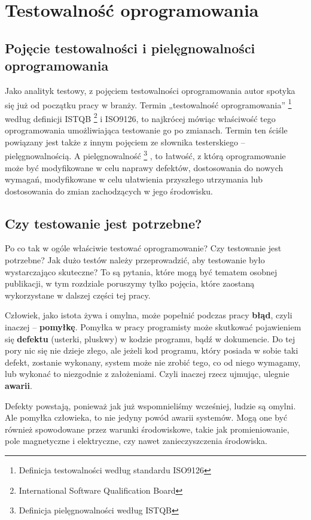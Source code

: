 \chapter{Testowalność oprogramowania}
\label{testowalnosc}
\section{Pojęcie testowalności i pielęgnowalności oprogramowania}
Jako analityk testowy, z pojęciem testowalności oprogramowania autor spotyka się już od początku pracy w branży. Termin „testowalność oprogramowania” \footnote{Definicja testowalności według standardu ISO9126}  według definicji ISTQB \footnote{International Software Qualification Board}  i ISO9126, to najkrócej mówiąc właściwość tego oprogramowania umożliwiająca testowanie go po zmianach. Termin ten ściśle powiązany jest także z innym pojęciem ze słownika testerskiego – pielęgnowalnością. A pielęgnowalność \footnote{Definicja pielęgnowalności według ISTQB} , to łatwość, z którą oprogramowanie może być modyfikowane w celu naprawy defektów, dostosowania do nowych wymagań, modyfikowane w celu ułatwienia przyszłego utrzymania lub dostosowania do zmian zachodzących w jego środowisku.

\section{Czy testowanie jest potrzebne?}
Po co tak w ogóle właściwie testować oprogramowanie? Czy testowanie jest potrzebne? Jak dużo testów należy przeprowadzić, aby testowanie było wystarczająco skuteczne? To są pytania, które mogą być tematem osobnej publikacji, w tym rozdziale poruszymy tylko pojęcia, które zaostaną wykorzystane w dalszej części tej pracy.

Człowiek, jako istota żywa i omylna, może popełnić podczas pracy \textbf{błąd}, czyli inaczej – \textbf{pomyłkę}. Pomyłka w pracy programisty może skutkować pojawieniem się \textbf{defektu} (usterki, pluskwy) w kodzie programu, bądź w dokumencie. Do tej pory nic się nie dzieje złego, ale jeżeli kod programu, który posiada w sobie taki defekt, zostanie wykonany, system może nie zrobić tego, co od niego wymagamy, lub wykonać to niezgodnie z założeniami. Czyli inaczej rzecz ujmując, ulegnie \textbf{awarii}. 

Defekty powstają, ponieważ jak już wspomnieliśmy wcześniej, ludzie są omylni. Ale pomyłka człowieka, to nie jedyny powód awarii systemów. Mogą one być również spowodowane przez warunki środowiskowe, takie jak promieniowanie, pole magnetyczne i elektryczne, czy nawet zanieczyszczenia środowiska.

